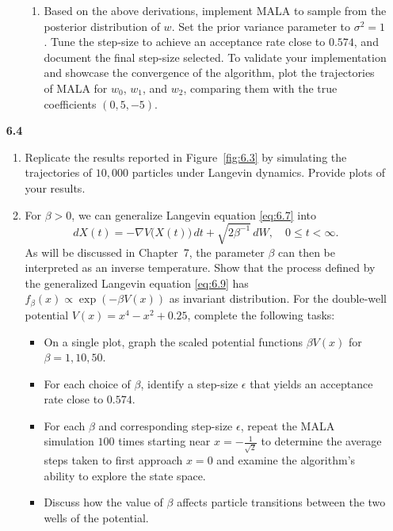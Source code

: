 \begin{enumerate}
\begin{enumerate}[label=\arabic*.]
\begin{enumerate}[label=\alph*),start=2]
      \item Based on the above derivations, implement MALA to sample from the posterior
        distribution of $w$. Set the prior variance parameter to $\sigma^2 = 1$. Tune the
        step-size to achieve an acceptance rate close to $0.574$, and document the final
        step-size selected. To validate your implementation and showcase the convergence of
        the algorithm, plot the trajectories of MALA for $w_0$, $w_1$, and $w_2$, comparing
        them with the true coefficients $(0, 5, -5)$.
    \end{enumerate}
\end{enumerate}

\item[\textbf{6.4}]

\begin{enumerate}[label=\alph*)]
  \item Replicate the results reported in Figure~\ref{fig:6.3} by simulating the trajectories
    of $10{,}000$ particles under Langevin dynamics. Provide plots of your results.

  \item For $\beta > 0$, we can generalize Langevin equation \eqref{eq:6.7} into
    \begin{equation}
      \label{eq:6.9}
      dX(t) = -\nabla V\!\bigl(X(t)\bigr)\,dt + \sqrt{2\beta^{-1}}\,dW, \quad 0 \le t < \infty.
    \end{equation}
    As will be discussed in Chapter~7, the parameter $\beta$ can then be interpreted as an
    inverse temperature. Show that the process defined by the generalized Langevin equation
    \eqref{eq:6.9} has $f_\beta(x) \propto \exp(-\beta V(x))$ as invariant distribution.
    For the double-well potential $V(x) = x^4 - x^2 + 0.25$, complete the following tasks:
    \begin{itemize}
      \item On a single plot, graph the scaled potential functions $\beta V(x)$ for
        $\beta = 1, 10, 50$.
      \item For each choice of $\beta$, identify a step-size $\epsilon$ that yields an
        acceptance rate close to $0.574$.
      \item For each $\beta$ and corresponding step-size $\epsilon$, repeat the MALA simulation
        $100$ times starting near $x = -\frac{1}{\sqrt{2}}$ to determine the average steps
        taken to first approach $x = 0$ and examine the algorithm's ability to explore the
        state space.
      \item Discuss how the value of $\beta$ affects particle transitions between the two wells
        of the potential.
    \end{itemize}
\end{enumerate}

\end{enumerate}
